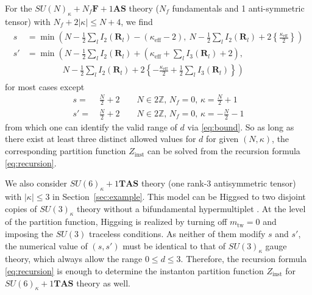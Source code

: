 \documentclass[letterpaper, 11pt]{article}
\newcommand{\nn}{\nonumber}
\def\k{\kappa}
\begin{document}
{For the $SU(N)_\kappa + N_f\mathbf{F} + 1\mathbf{AS}$ theory ($N_f$ fundamentals and 1 anti-symmetric tensor) with $N_f + 2|\kappa| \leq N+4$, we find
\begin{align}
  \label{eq:sun-nf-na}
  \begin{split}
  s &= \min  
  \left(N - \frac{1}{2} \sum_{l}I_2(\mathbf{R}_l) - (\k_\text{eff}-2),\ N - \frac{1}{2} \sum_{l}I_2(\mathbf{R}_l) + 2 \left\{\frac{\k_\text{eff}}{2}\right\}\right) \\
  s' &= \min  
  \left(N - \frac{1}{2} \sum_{l}I_2(\mathbf{R}_l) + \left(\k_\text{eff}+\sum_{l}I_3(\mathbf{R}_l)+2\right),\right. \\& \left. \qquad \qquad \  N - \frac{1}{2} \sum_{l}I_2(\mathbf{R}_l) + 2\left\{-\frac{\k_\text{eff}}{2}+\frac{1}{2}\sum_{l}I_3(\mathbf{R}_l) \right\}\right)
  \end{split} 
\end{align} for most cases except
\begin{align}
s=&\,\frac{N}{2}+2 \qquad N\in2\mathbb{Z},\,N_f=0,\,\kappa=\frac{N}{2}+1\nn\\
s'=&\,\frac{N}{2}+2 \qquad N\in2\mathbb{Z},\,N_f=0,\,\kappa=-\frac{N}{2}-1
\end{align}
from which one can identify the valid range of $d$ via \eqref{eq:bound}. 
So as long as there exist at least three distinct allowed values for $d$ for given $(N, \kappa)$, the corresponding partition function $Z_{\text{inst}}$ can be solved from the recursion formula \eqref{eq:recursion}. 

We also consider $SU(6)_\kappa  + 1 \mathbf{TAS}$ theory (one rank-3 antisymmetric tensor) with $|\kappa| \leq 3$ in Section~\ref{sec:example}. This model can be Higgsed to two disjoint copies of $SU(3)_\kappa$ theory without a bifundamental hypermultiplet \cite{Hayashi:2019yxj}. At the level of the partition function, Higgsing is realized by turning off $m_\text{tw} = 0$ and imposing the $SU(3)$ traceless conditions. As neither of them modify $s$ and $s'$, the numerical value of $(s,s')$ must be identical to that of $SU(3)_\kappa$ gauge theory, which always allow the range $0\leq d \leq 3$. Therefore, the recursion formula \eqref{eq:recursion} is enough to determine the instanton partition function $Z_{\text{inst}}$ for $SU(6)_\kappa  + 1 \mathbf{TAS}$ theory as well.


}
\end{document}
